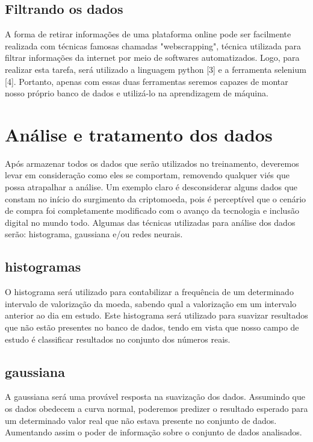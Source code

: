 \documentclass[conference]{IEEEtran}
\begin{document}
\subsection{Filtrando os dados}

A forma de retirar informações de uma plataforma online pode ser facilmente realizada com técnicas famosas chamadas "webscrapping", técnica utilizada para filtrar informações da internet por meio de softwares automatizados. Logo, para realizar esta tarefa, será utilizado a linguagem python [3] e a ferramenta selenium [4]. Portanto, apenas com essas duas ferramentas seremos capazes de montar nosso próprio banco de dados e utilizá-lo na aprendizagem de máquina.

\section{Análise e tratamento dos dados}

Após armazenar todos os dados que serão utilizados no treinamento, deveremos levar em consideração como eles se comportam, removendo qualquer viés que possa atrapalhar a análise. Um exemplo claro é desconsiderar alguns dados que constam no início do surgimento da criptomoeda, pois é perceptível que o cenário de compra foi completamente modificado com o avanço da tecnologia e inclusão digital no mundo todo. Algumas das técnicas utilizadas para análise dos dados serão: histograma, gaussiana e/ou redes neurais.

\subsection{histogramas}\label{AA}
O histograma será utilizado para contabilizar a frequência de um determinado intervalo de valorização da moeda, sabendo qual a valorização em um intervalo anterior ao dia em estudo. Este histograma será utilizado para suavizar resultados que não estão presentes no banco de dados, tendo em vista que nosso campo de estudo é classificar resultados no conjunto dos números reais.

\subsection{gaussiana}
A gaussiana será uma provável resposta na suavização dos dados. Assumindo que os dados obedecem a curva normal, poderemos predizer o resultado esperado para um determinado valor real que não estava presente no conjunto de dados. Aumentando assim o poder de informação sobre o conjunto de dados analisados.
\end{document}
